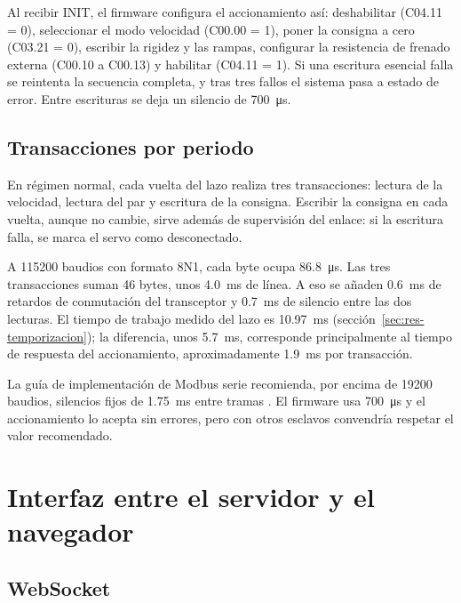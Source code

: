 Al recibir INIT, el firmware configura el accionamiento así: deshabilitar (C04.11 = 0), seleccionar
el modo velocidad (C00.00 = 1), poner la consigna a cero (C03.21 = 0), escribir la rigidez y las
rampas, configurar la resistencia de frenado externa (C00.10 a C00.13) y habilitar (C04.11 = 1). Si
una escritura esencial falla se reintenta la secuencia completa, y tras tres fallos el sistema pasa
a estado de error. Entre escrituras se deja un silencio de \SI{700}{\micro\second}.

\subsection{Transacciones por periodo}

En régimen normal, cada vuelta del lazo realiza tres transacciones: lectura de la velocidad, lectura
del par y escritura de la consigna. Escribir la consigna en cada vuelta, aunque no cambie, sirve
además de supervisión del enlace: si la escritura falla, se marca el servo como desconectado.

A 115200 baudios con formato 8N1, cada byte ocupa \SI{86.8}{\micro\second}. Las tres transacciones
suman 46 bytes, unos \SI{4.0}{\milli\second} de línea. A eso se añaden \SI{0.6}{\milli\second} de
retardos de conmutación del transceptor y \SI{0.7}{\milli\second} de silencio entre las dos lecturas.
El tiempo de trabajo medido del lazo es \SI{10.97}{\milli\second}
(sección~\ref{sec:res-temporizacion}); la diferencia, unos \SI{5.7}{\milli\second}, corresponde
principalmente al tiempo de respuesta del accionamiento, aproximadamente \SI{1.9}{\milli\second} por
transacción.

La guía de implementación de Modbus serie recomienda, por encima de 19200 baudios, silencios fijos
de \SI{1.75}{\milli\second} entre tramas \cite{modbusserial}. El firmware usa
\SI{700}{\micro\second} y el accionamiento lo acepta sin errores, pero con otros esclavos convendría
respetar el valor recomendado.

\section{Interfaz entre el servidor y el navegador}

\subsection{WebSocket}

